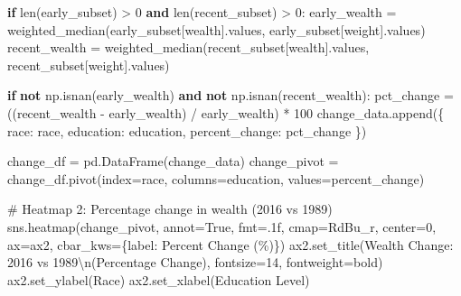 \documentclass[
  letterpaper,
  DIV=11,
  numbers=noendperiod]{scrartcl}
\newenvironment{Shaded}{\begin{snugshade}}{\end{snugshade}}
\newcommand{\BuiltInTok}[1]{\textcolor[rgb]{0.00,0.23,0.31}{#1}}
\newcommand{\CharTok}[1]{\textcolor[rgb]{0.13,0.47,0.30}{#1}}
\newcommand{\CommentTok}[1]{\textcolor[rgb]{0.37,0.37,0.37}{#1}}
\newcommand{\ControlFlowTok}[1]{\textcolor[rgb]{0.00,0.23,0.31}{\textbf{#1}}}
\newcommand{\DecValTok}[1]{\textcolor[rgb]{0.68,0.00,0.00}{#1}}
\newcommand{\KeywordTok}[1]{\textcolor[rgb]{0.00,0.23,0.31}{\textbf{#1}}}
\newcommand{\NormalTok}[1]{\textcolor[rgb]{0.00,0.23,0.31}{#1}}
\newcommand{\OperatorTok}[1]{\textcolor[rgb]{0.37,0.37,0.37}{#1}}
\newcommand{\StringTok}[1]{\textcolor[rgb]{0.13,0.47,0.30}{#1}}
\newcommand{\VariableTok}[1]{\textcolor[rgb]{0.07,0.07,0.07}{#1}}
\begin{document}
\begin{Shaded}
\begin{Highlighting}[]
        \ControlFlowTok{if} \BuiltInTok{len}\NormalTok{(early\_subset) }\OperatorTok{\textgreater{}} \DecValTok{0} \KeywordTok{and} \BuiltInTok{len}\NormalTok{(recent\_subset) }\OperatorTok{\textgreater{}} \DecValTok{0}\NormalTok{:}
\NormalTok{            early\_wealth }\OperatorTok{=}\NormalTok{ weighted\_median(early\_subset[}\StringTok{\textquotesingle{}wealth\textquotesingle{}}\NormalTok{].values, early\_subset[}\StringTok{\textquotesingle{}weight\textquotesingle{}}\NormalTok{].values)}
\NormalTok{            recent\_wealth }\OperatorTok{=}\NormalTok{ weighted\_median(recent\_subset[}\StringTok{\textquotesingle{}wealth\textquotesingle{}}\NormalTok{].values, recent\_subset[}\StringTok{\textquotesingle{}weight\textquotesingle{}}\NormalTok{].values)}
            
            \ControlFlowTok{if} \KeywordTok{not}\NormalTok{ np.isnan(early\_wealth) }\KeywordTok{and} \KeywordTok{not}\NormalTok{ np.isnan(recent\_wealth):}
\NormalTok{                pct\_change }\OperatorTok{=}\NormalTok{ ((recent\_wealth }\OperatorTok{{-}}\NormalTok{ early\_wealth) }\OperatorTok{/}\NormalTok{ early\_wealth) }\OperatorTok{*} \DecValTok{100}
\NormalTok{                change\_data.append(\{}
                    \StringTok{\textquotesingle{}race\textquotesingle{}}\NormalTok{: race,}
                    \StringTok{\textquotesingle{}education\textquotesingle{}}\NormalTok{: education,}
                    \StringTok{\textquotesingle{}percent\_change\textquotesingle{}}\NormalTok{: pct\_change}
\NormalTok{                \})}

\NormalTok{change\_df }\OperatorTok{=}\NormalTok{ pd.DataFrame(change\_data)}
\NormalTok{change\_pivot }\OperatorTok{=}\NormalTok{ change\_df.pivot(index}\OperatorTok{=}\StringTok{\textquotesingle{}race\textquotesingle{}}\NormalTok{, columns}\OperatorTok{=}\StringTok{\textquotesingle{}education\textquotesingle{}}\NormalTok{, values}\OperatorTok{=}\StringTok{\textquotesingle{}percent\_change\textquotesingle{}}\NormalTok{)}

\CommentTok{\# Heatmap 2: Percentage change in wealth (2016 vs 1989)}
\NormalTok{sns.heatmap(change\_pivot, annot}\OperatorTok{=}\VariableTok{True}\NormalTok{, fmt}\OperatorTok{=}\StringTok{\textquotesingle{}.1f\textquotesingle{}}\NormalTok{, cmap}\OperatorTok{=}\StringTok{\textquotesingle{}RdBu\_r\textquotesingle{}}\NormalTok{, center}\OperatorTok{=}\DecValTok{0}\NormalTok{, ax}\OperatorTok{=}\NormalTok{ax2,}
\NormalTok{            cbar\_kws}\OperatorTok{=}\NormalTok{\{}\StringTok{\textquotesingle{}label\textquotesingle{}}\NormalTok{: }\StringTok{\textquotesingle{}Percent Change (\%)\textquotesingle{}}\NormalTok{\})}
\NormalTok{ax2.set\_title(}\StringTok{\textquotesingle{}Wealth Change: 2016 vs 1989}\CharTok{\textbackslash{}n}\StringTok{(Percentage Change)\textquotesingle{}}\NormalTok{, }
\NormalTok{              fontsize}\OperatorTok{=}\DecValTok{14}\NormalTok{, fontweight}\OperatorTok{=}\StringTok{\textquotesingle{}bold\textquotesingle{}}\NormalTok{)}
\NormalTok{ax2.set\_ylabel(}\StringTok{\textquotesingle{}Race\textquotesingle{}}\NormalTok{)}
\NormalTok{ax2.set\_xlabel(}\StringTok{\textquotesingle{}Education Level\textquotesingle{}}\NormalTok{)}


\end{Highlighting}
\end{Shaded}
\end{document}
